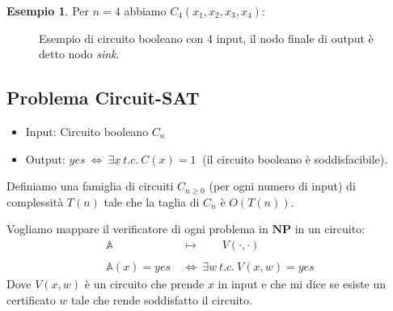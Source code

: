 \documentclass[a4paper]{article}
\theoremstyle{definition}
\newtheorem{esempio}{Esempio}[subsection]
\newcommand{\np}{\mathbf{NP}}
\newcommand{\prob}[1]{\mathbb{#1}}
\begin{document}
		\begin{esempio}
			Per $ n = 4 $ abbiamo $ C_4(x_1, x_2, x_3, x_4) $:
			\begin{figure}[h!]
				\centering
				\caption{Esempio di circuito booleano con 4 input, il nodo finale di output è detto nodo \textit{sink}.}
			\end{figure}
		\end{esempio}
		
	\subsection{Problema Circuit-SAT}
		\begin{itemize}
			\item Input: Circuito booleano $ C_n $
			\item Output: $ yes \ \Leftrightarrow \ \exists \underline{x} \ t.c. \ C(x) = 1 \ $ (il circuito booleano è soddisfacibile).
		\end{itemize}
		Definiamo una famiglia di circuiti $ C_{n\geq 0} $ (per ogni numero di input) di complessità $ T(n) $ tale che la taglia di $ C_n $ è $ O(T(n)) $.
		
		Vogliamo mappare il verificatore di ogni problema in $ \np $ in un circuito:
		\begin{align*}
			\prob{A} \qquad &\longmapsto \qquad V(\cdot, \cdot)\\ \\
			\prob{A}(x) = yes\ &\Leftrightarrow\ \exists w \ t.c.\ V(x, w) = yes
		\end{align*}
		Dove $ V(x, w) $ è un circuito che prende $ x $ in input e che mi dice se esiste un certificato $ w $ tale che rende soddisfatto il circuito.
		
\end{document}
